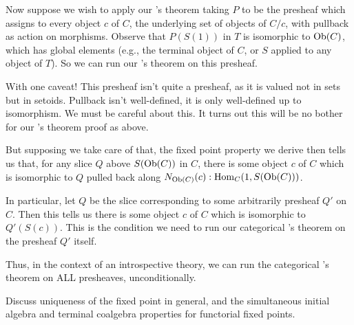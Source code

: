 Now suppose we wish to apply our \Loeb's theorem taking $P$ to be the presheaf which assigns to every object $c$ of $C$, the underlying set of objects of $C/c$, with pullback as action on morphisms. Observe that $P(S(1))$ in $T$ is isomorphic to $\operatorname{Ob}(C)$, which has global elements (e.g., the terminal object of $C$, or $S$ applied to any object of $T$). So we can run our \Loeb's theorem on this presheaf.

With one caveat! This presheaf isn't quite a presheaf, as it is valued not in sets but in setoids. Pullback isn't well-defined, it is only well-defined up to isomorphism. We must be careful about this. It turns out this will be no bother for our \Loeb's theorem proof as above. 

But supposing we take care of that, the fixed point property we derive then tells us that, for any slice $Q$ above $S(\operatorname{Ob}(C))$ in $C$, there is some object $c$ of $C$ which is isomorphic to $Q$ pulled back along $N_{\operatorname{Ob}(C)}(c) : \operatorname{Hom}_C(1, S(\operatorname{Ob}(C)))$.

In particular, let $Q$ be the slice corresponding to some arbitrarily presheaf $Q'$ on $C$. Then this tells us there is some object $c$ of $C$ which is isomorphic to $Q'(S(c))$. This is the condition we need to run our categorical \Loeb's theorem on the presheaf $Q'$ itself.

Thus, in the context of an introspective theory, we can run the categorical \Loeb's theorem on ALL presheaves, unconditionally.

\begin{TODOblock}
Discuss uniqueness of the fixed point in general, and the simultaneous initial algebra and terminal coalgebra properties for functorial fixed points.
\end{TODOblock}